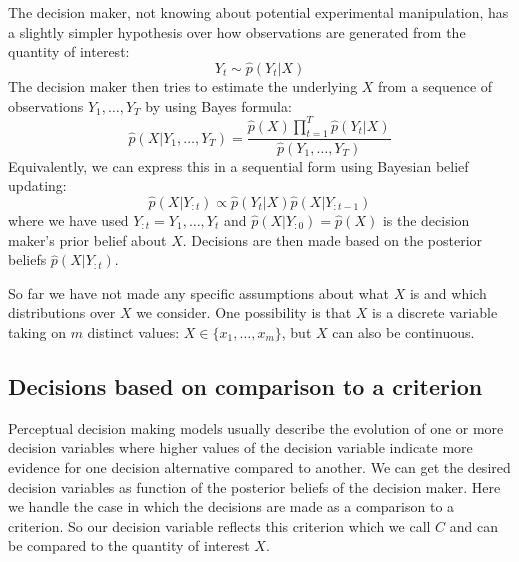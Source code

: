 \documentclass[10pt,a4paper]{article}
\begin{document}
The decision maker, not knowing about potential experimental manipulation, has a slightly simpler hypothesis over how observations are generated from the quantity of interest:
\begin{equation}
Y_t \sim \hat{p}(Y_t | X)
\end{equation}
The decision maker then tries to estimate the underlying $X$ from a sequence of observations $Y_1, \dots, Y_T$ by using Bayes formula:
\begin{equation}
\hat{p}(X | Y_1, \dots, Y_T) = \frac{\hat{p}(X)\prod_{t=1}^T \hat{p}(Y_t | X)}{\hat{p}(Y_1, \dots, Y_T)}  
\end{equation}
Equivalently, we can express this in a sequential form using Bayesian belief updating:
\begin{equation}\label{eq:beliefupdate}
\hat{p}(X | Y_{:t}) \propto \hat{p}(Y_t | X) \hat{p}(X | Y_{:t-1})
\end{equation}
where we have used $Y_{:t} = Y_1, \dots, Y_t$ and $\hat{p}(X|Y_{:0}) = \hat{p}(X)$ is the decision maker's prior belief about $X$. Decisions are then made based on the posterior beliefs $\hat{p}(X | Y_{:t})$.

So far we have not made any specific assumptions about what $X$ is and which distributions over $X$ we consider. One possibility is that $X$ is a discrete variable taking on $m$ distinct values: $X \in \{x_1, \dots, x_m\}$, but $X$ can also be continuous.

\subsection{Decisions based on comparison to a criterion}
Perceptual decision making models usually describe the evolution of one or more decision variables where higher values of the decision variable indicate more evidence for one decision alternative compared to another. We can get the desired decision variables as function of the posterior beliefs of the decision maker. Here we handle the case in which the decisions are made as a comparison to a criterion. So our decision variable reflects this criterion which we call $C$ and can be compared to the quantity of interest $X$.
\end{document}
